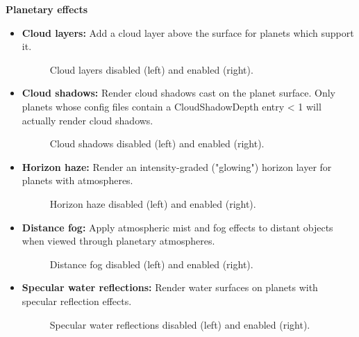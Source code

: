 \documentclass[Orbiter User Manual.tex]{subfiles}
\begin{document}
\noindent
\textbf{Planetary effects}
\begin{itemize}
\item \textbf{Cloud layers:} Add a cloud layer above the surface for planets which support it.

\begin{figure}[H]
	\centering
	\caption{Cloud layers disabled (left) and enabled (right).}
\end{figure}

\item \textbf{Cloud shadows:} Render cloud shadows cast on the planet surface. Only planets whose config files contain a CloudShadowDepth entry < 1 will actually render cloud shadows.

\begin{figure}[H]
	\centering
	\caption{Cloud shadows disabled (left) and enabled (right).}
\end{figure}

\item \textbf{Horizon haze:} Render an intensity-graded ("glowing") horizon layer for planets with atmospheres.

\begin{figure}[H]
	\centering
	\caption{Horizon haze disabled (left) and enabled (right).}
\end{figure}

\item \textbf{Distance fog:} Apply atmospheric mist and fog effects to distant objects when viewed through planetary atmospheres.

\begin{figure}[H]
	\centering
	\caption{Distance fog disabled (left) and enabled (right).}
\end{figure}

\item \textbf{Specular water reflections:} Render water surfaces on planets with specular reflection effects.

\begin{figure}[H]
	\centering
	\caption{Specular water reflections disabled (left) and enabled (right).}
\end{figure}


\end{itemize}
\end{document}
